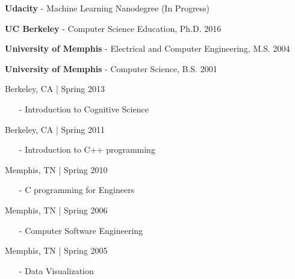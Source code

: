 \documentclass[11pt,article,oneside]{memoir}
\begin{document}
\bigskip
\bigskip




\ind \textbf{Udacity} - Machine Learning Nanodegree  \hfill (In Progress)

\ind \textbf{UC Berkeley} - Computer Science Education, Ph.D. \hfill 2016

\ind \textbf{University of Memphis} - Electrical and Computer Engineering, M.S. \hfill 2004

\ind \textbf{University of Memphis} - Computer Science, B.S. \hfill 2001

\bigskip

\medskip

 \hfill Berkeley, CA | Spring 2013
\begin{itemize}[noitemsep,nolistsep] 
\item[-] Introduction to Cognitive Science
\end{itemize} 

 \hfill Berkeley, CA | Spring 2011
\begin{itemize}[noitemsep,nolistsep] 
\item[-] Introduction to C++ programming
\end{itemize} 

 \hfill Memphis, TN | Spring 2010
\begin{itemize}[noitemsep,nolistsep]
\item[-] C programming for Engineers
\end{itemize}

 \hfill Memphis, TN | Spring 2006
\begin{itemize}[noitemsep,nolistsep]
\item[-] Computer Software Engineering
\end{itemize}

 \hfill Memphis, TN | Spring 2005
\begin{itemize}[noitemsep,nolistsep]
\item[-] Data Visualization
\end{itemize}
\end{document}
